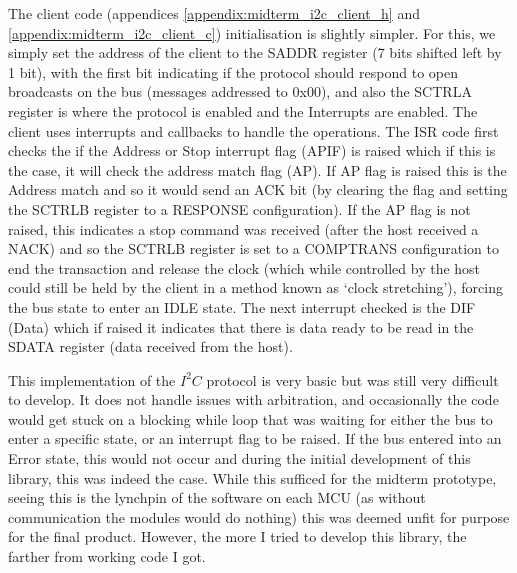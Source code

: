 \documentclass[11pt,a4paper,titlepage]{report}
\begin{document}
	 The client code (appendices \ref{appendix:midterm_i2c_client_h} and \ref{appendix:midterm_i2c_client_c}) initialisation is slightly simpler. For this, we simply set the address of the client to the SADDR register (7 bits shifted left by 1 bit), with the first bit indicating if the protocol should respond to open broadcasts on the bus (messages addressed to 0x00), and also the SCTRLA register is where the protocol is enabled and the Interrupts are enabled. The client uses interrupts and callbacks to handle the operations. The ISR code first checks the if the Address or Stop interrupt flag (APIF) is raised which if this is the case, it will check the address match flag (AP). If AP flag is raised this is the Address match and so it would send an ACK bit (by clearing the flag and setting the SCTRLB register to a RESPONSE configuration). If the AP flag is not raised, this indicates a stop command was received (after the host received a NACK) and so the SCTRLB register is set to a COMPTRANS configuration to end the transaction and release the clock (which while controlled by the host could still be held by the client in a method known as `clock stretching'), forcing the bus state to enter an IDLE state.  The next interrupt checked is the DIF (Data) which if raised it indicates that there is data ready to be read in the SDATA register (data received from the host). 
	 
	 This implementation of the $I^{2}C$ protocol is very basic but was still very difficult to develop. It does not handle issues with arbitration, and occasionally the code would get stuck on a blocking while loop that was waiting for either the bus to enter a specific state, or an interrupt flag to be raised. If the bus entered into an Error state, this would not occur and during the initial development of this library, this was indeed the case. While this sufficed for the midterm prototype, seeing this is the lynchpin of the software on each MCU (as without communication the modules would do nothing) this was deemed unfit for purpose for the final product. However, the more I tried to develop this library, the farther from working code I got. 
	 
\end{document}
